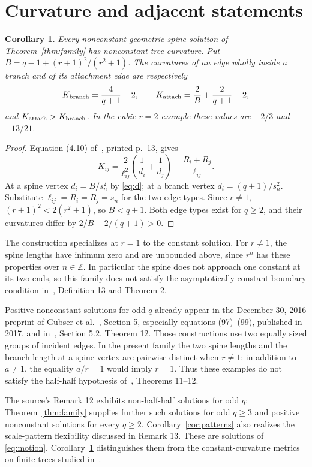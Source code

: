 \documentclass[11pt]{article}
\newtheorem{corollary}[theorem]{Corollary}
\begin{document}
\section{Curvature and adjacent statements}
\begin{corollary}\label{cor:curvature}
Every nonconstant geometric-spine solution of Theorem~\ref{thm:family}
has nonconstant tree curvature. Put
$B=q-1+(r+1)^2/(r^2+1)$. The curvatures of an edge wholly inside a
branch and of its attachment edge are respectively
\[
 K_{\rm branch}=\frac4{q+1}-2,\qquad
 K_{\rm attach}=\frac2B+\frac2{q+1}-2,
\]
and $K_{\rm attach}>K_{\rm branch}$. In the cubic $r=2$ example these
values are $-2/3$ and $-13/21$.
\end{corollary}
\begin{proof}
Equation (4.10) of~\cite{HSXZ}, printed p.~13, gives
\[
 K_{ij}=\frac2{\ell_{ij}^2}\left(\frac1{d_i}+\frac1{d_j}\right)
          -\frac{R_i+R_j}{\ell_{ij}}.
\]
At a spine vertex $d_i=B/s_n^2$ by \eqref{eq:d}; at a branch vertex
$d_i=(q+1)/s_n^2$. Substitute $\ell_{ij}=R_i=R_j=s_n$ for the two
edge types. Since $r\ne1$, $(r+1)^2<2(r^2+1)$, so $B<q+1$.
Both edge types exist for $q\geq2$, and their curvatures differ by
$2/B-2/(q+1)>0$.
\end{proof}

The construction specializes at $r=1$ to the constant solution.
For $r\ne1$, the spine lengths have infimum zero and are unbounded
above, since $r^n$ has these properties over $n\in\mathbb Z$.
In particular the spine does not approach one constant at its two
ends, so this family does not satisfy the asymptotically constant
boundary condition in~\cite{HSXZ}, Definition 13 and Theorem 2.

Positive nonconstant solutions for odd $q$ already appear in the
December 30, 2016 preprint of Gubser et al.~\cite{G}, Section 5,
especially equations (97)--(99), published in 2017,
and in~\cite{HSXZ}, Section 5.2, Theorem 12. Those constructions use
two equally sized groups of incident edges. In the present family
the two spine lengths and the branch length at a spine vertex are
pairwise distinct when $r\ne1$: in addition to $a\ne1$, the equality
$a/r=1$ would imply $r=1$. Thus these examples do not satisfy the
half-half hypothesis of~\cite{HSXZ}, Theorems 11--12.

The source's Remark 12 exhibits non-half-half solutions for odd $q$;
Theorem~\ref{thm:family} supplies further such solutions for odd $q\geq3$
and positive nonconstant solutions for every $q\geq2$.
Corollary~\ref{cor:patterns} also realizes the scale-pattern flexibility
discussed in Remark 13. These are solutions of \eqref{eq:motion}.
Corollary~\ref{cor:curvature} distinguishes them from the
constant-curvature metrics on finite trees studied in~\cite{BCH,Cheng}.
\end{document}
